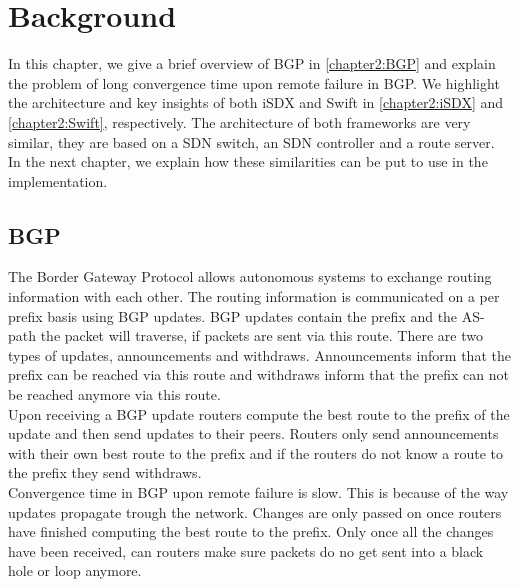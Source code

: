 
\chapter{\label{chapter2}Background}

In this chapter, we give a brief overview of BGP in \ref{chapter2:BGP} and explain the problem of long convergence time upon remote failure in BGP. We highlight the architecture and key insights of both iSDX and Swift in \ref{chapter2:iSDX} and \ref{chapter2:Swift}, respectively. The architecture of both frameworks are very similar, they are based on a SDN switch, an SDN controller and a route server. In the next chapter, we explain how these similarities can be put to use in the implementation.

\section{\label{chapter2:BGP}BGP}

The Border Gateway Protocol allows autonomous systems to exchange routing information with each other. The routing information is communicated on a per prefix basis using BGP updates. BGP updates contain the prefix and the AS-path the packet will traverse, if packets are sent via this route. There are two types of updates, announcements and withdraws. Announcements inform that the prefix can be reached via this route and withdraws inform that the prefix can not be reached anymore via this route. \\
Upon receiving a BGP update routers compute the best route to the prefix of the update and then send updates to their peers. Routers only send announcements with their own best route to the prefix and if the routers do not know a route to the prefix they send withdraws.  \\
Convergence time in BGP upon remote failure is slow.
This is because of the way updates propagate trough the network. Changes are only passed on once routers have finished computing the best route to the prefix. Only once all the changes have been received, can routers make sure packets do no get sent into a black hole or loop anymore.



